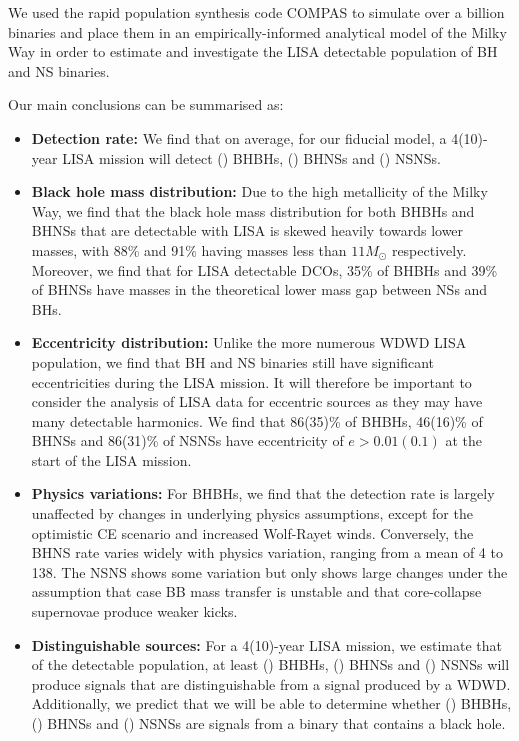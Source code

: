 We used the rapid population synthesis code COMPAS to simulate over a billion binaries and place them in an empirically-informed analytical model of the Milky Way in order to estimate and investigate the LISA detectable population of BH and NS binaries.


Our main conclusions can be summarised as:
\begin{itemize}
    \item \textbf{Detection rate:} We find that on average, for our fiducial model, a 4(10)-year LISA mission will detect \BHBHFourYear{}(\BHBHTenYear{}) BHBHs, \BHNSFourYear{}(\BHNSTenYear{}) BHNSs and \NSNSFourYear{}(\NSNSTenYear{}) NSNSs.
    \item \textbf{Black hole mass distribution:} Due to the high metallicity of the Milky Way, we find that the black hole mass distribution for both BHBHs and BHNSs that are detectable with LISA is skewed heavily towards lower masses, with 88\% and 91\% having masses less than $11 \unit{M_\odot}$ respectively. Moreover, we find that for LISA detectable DCOs, 35\% of BHBHs and 39\% of BHNSs have masses in the theoretical lower mass gap between NSs and BHs.
    \item \textbf{Eccentricity distribution:} Unlike the more numerous WDWD LISA population, we find that BH and NS binaries still have significant eccentricities during the LISA mission. It will therefore be important to consider the analysis of LISA data for eccentric sources as they may have many detectable harmonics. We find that 86(35)\% of BHBHs, 46(16)\% of BHNSs and 86(31)\% of NSNSs have eccentricity of $e > 0.01(0.1)$ at the start of the LISA mission.
    \item \textbf{Physics variations:} For BHBHs, we find that the detection rate is largely unaffected by changes in underlying physics assumptions, except for the optimistic CE scenario and increased Wolf-Rayet winds. Conversely, the BHNS rate varies widely with physics variation, ranging from a mean of 4 to 138. The NSNS shows some variation but only shows large changes under the assumption that case BB mass transfer is unstable and that core-collapse supernovae produce weaker kicks.
    \item \textbf{Distinguishable sources:} For a 4(10)-year LISA mission, we estimate that of the detectable population, at least \BHBHNotWDWDFour{}(\BHBHNotWDWDTen{}) BHBHs, \BHNSNotWDWDFour{}(\BHNSNotWDWDTen{}) BHNSs and \NSNSNotWDWDFour{}(\NSNSNotWDWDTen{}) NSNSs will produce signals that are distinguishable from a signal produced by a WDWD. Additionally, we predict that we will be able to determine whether \BHBHDistinguishedFour{}(\BHBHDistinguishedTen{}) BHBHs, \BHNSDistinguishedFour{}(\BHNSDistinguishedTen{}) BHNSs and \NSNSDistinguishedFour{}(\NSNSDistinguishedTen{}) NSNSs are signals from a binary that contains a black hole.

\end{itemize}
